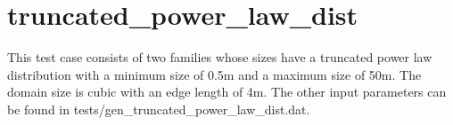 \documentclass[letterpaper,10pt,english]{sphinxmanual}
\begin{document}
\begin{DUlineblock}{0em}
\item[] 
\item[] 
\end{DUlineblock}


\section{truncated\_power\_law\_dist}
\label{tutorial:truncated-power-law-dist}
This test case consists of two families whose sizes have a truncated power law distribution with a minimum size of 0.5m and a maximum size of 50m. The domain size is cubic with an edge length of 4m. The other input parameters can be found in tests/gen\_truncated\_power\_law\_dist.dat.

{\hfill{}\hfill}

\begin{DUlineblock}{0em}
\item[] 
\item[] 
\end{DUlineblock}

{\hfill{}\hfill}

\begin{DUlineblock}{0em}
\item[] 
\item[] 
\end{DUlineblock}
\end{document}
